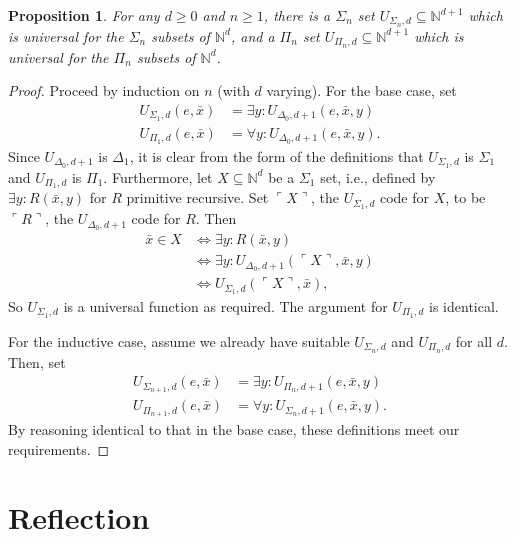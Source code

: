 \documentclass{article}
\theoremstyle{plain}
\newtheorem{prop}[thm]{Proposition}
\theoremstyle{definition}
\newcommand{\tuple}{\bar}
\newcommand{\lgnum}{\ulcorner}
\newcommand{\rgnum}{\urcorner}
\begin{document}
\begin{prop}
  For any $d \geq 0$ and $n \geq 1$, there is a $\Sigma_n$ set
  $U_{\Sigma_n,d} \subseteq \mathbb{N}^{d+1}$ which is universal for
  the $\Sigma_n$ subsets of $\mathbb{N}^d$, and a $\Pi_n$ set
  $U_{\Pi_n,d} \subseteq \mathbb{N}^{d+1}$ which is universal for the
  $\Pi_n$ subsets of $\mathbb{N}^d$.
\end{prop}
\begin{proof}
  Proceed by induction on $n$ (with $d$ varying). For the base case,
  set
  \begin{align*}
    U_{\Sigma_1,d}(e,\tuple{x}) &= \exists y : U_{\Delta_0,d+1}(e,\tuple{x},y) \\
    U_{\Pi_1,d}(e,\tuple{x}) &= \forall y : U_{\Delta_0,d+1}(e,\tuple{x},y)
    \text{.}
  \end{align*}
  Since $U_{\Delta_0,d+1}$ is $\Delta_1$, it is clear from the form of
  the definitions that $U_{\Sigma_1,d}$ is $\Sigma_1$ and
  $U_{\Pi_1,d}$ is $\Pi_1$. Furthermore, let $X \subseteq
  \mathbb{N}^d$ be a $\Sigma_1$ set, i.e., defined by $\exists y :
  R(\tuple{x},y)$ for $R$ primitive recursive. Set $\lgnum X \rgnum$,
  the $U_{\Sigma_1,d}$ code for $X$, to be $\lgnum R \rgnum$, the
  $U_{\Delta_0,d+1}$ code for $R$. Then
  \begin{align*}
    \tuple{x} \in X
    &\iff \exists y : R(\tuple{x}, y) \\
    &\iff \exists y : U_{\Delta_0,d+1}(\lgnum X \rgnum, \tuple{x}, y) \\
    &\iff U_{\Sigma_1,d}(\lgnum X \rgnum, \tuple{x})
    \text{,}
  \end{align*}
  So $U_{\Sigma_1,d}$ is a universal function as required. The
  argument for $U_{\Pi_1,d}$ is identical.

  For the inductive case, assume we already have suitable
  $U_{\Sigma_n,d}$ and $U_{\Pi_n,d}$ for all $d$. Then, set
  \begin{align*}
    U_{\Sigma_{n+1},d}(e,\tuple{x}) &= \exists y : U_{\Pi_n,d+1}(e,\tuple{x},y) \\
    U_{\Pi_{n+1},d}(e,\tuple{x}) &= \forall y : U_{\Sigma_n,d+1}(e,\tuple{x},y)
    \text{.}
  \end{align*}
  By reasoning identical to that in the base case, these definitions
  meet our requirements.
\end{proof}

\section{Reflection}
\end{document}

